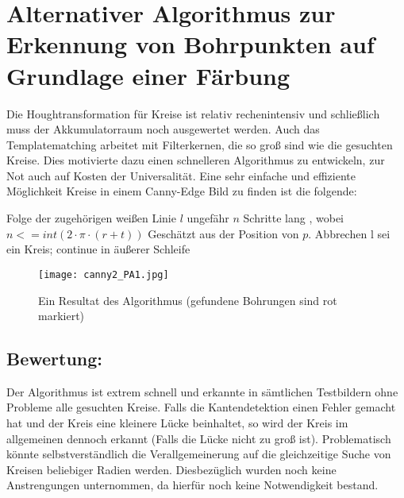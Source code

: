 \section{Alternativer Algorithmus zur Erkennung von Bohrpunkten auf Grundlage einer Färbung}
Die Houghtransformation für Kreise ist relativ rechenintensiv und schließlich muss der Akkumulatorraum noch ausgewertet werden. Auch das Templatematching arbeitet mit Filterkernen, die so groß sind wie die gesuchten Kreise. Dies motivierte dazu einen schnelleren Algorithmus zu entwickeln, zur Not auch auf Kosten der Universalität.
Eine sehr einfache und effiziente Möglichkeit Kreise in einem Canny-Edge Bild zu finden ist die folgende:
\newline
\begin{algorithmic}
    \State Folge der zugehörigen weißen Linie $l$ ungefähr $n$ Schritte lang
    \State , wobei $n <= int(2\cdot\pi\cdot(r+t))$
      \Comment Geschätzt aus der Position von $p$.
          \State Abbrechen             
        \EndIf 
          \State l sei ein Kreis; continue in äußerer Schleife            
        \EndIf
      \EndFor
  \EndIf
\EndFor
\EndProcedure \newline
\end{algorithmic}

\begin{figure}[H]
  \begin{center}
    \texttt{[image: canny2\_PA1.jpg]}
    \caption{Ein Resultat des Algorithmus (gefundene Bohrungen sind rot markiert)}
    \label{fig:b_alg_1}
  \end{center}
\end{figure}


\subsection{Bewertung:}
Der Algorithmus ist extrem schnell und erkannte in sämtlichen Testbildern ohne Probleme alle gesuchten Kreise. Falls die Kantendetektion einen Fehler gemacht hat und der Kreis eine kleinere Lücke beinhaltet, so wird der Kreis im allgemeinen dennoch erkannt (Falls die Lücke nicht zu groß ist). \newline
Problematisch könnte selbstverständlich die Verallgemeinerung auf die gleichzeitige Suche von Kreisen beliebiger Radien werden. Diesbezüglich wurden noch keine Anstrengungen unternommen, da hierfür noch keine Notwendigkeit bestand.

